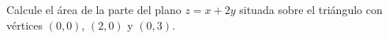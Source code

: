 Calcule el área de la parte del plano $z=x+2y$ situada sobre el triángulo con vértices $(0,0)$, $(2,0)$ y $(0,3)$.

